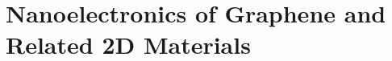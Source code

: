 \documentclass[
11pt, %
fleqn, %
a4paper, %
]{LegrandOrangeBook}
\begin{document}
	
	
	
	
	
	
	
	
	
	\pagestyle{empty} %
	
	\tableofcontents %
	
	
	
	\pagestyle{fancy} %
	
	
	
	\part{Nanoelectronics of Graphene and Related 2D Materials}
	
	
	
	
	
	
	
	
\end{document}

